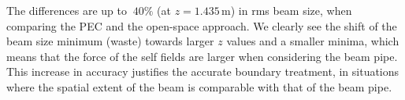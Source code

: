 
The differences are up to $~40\%$ (at $z=1.435$\,m) in rms beam size, when comparing the PEC and the open-space approach. We clearly see
the shift of the beam size minimum (waste) towards larger $z$ values and
a smaller minima, which means that the force of the self fields are
larger when considering the beam pipe.
This increase in accuracy justifies the 
accurate boundary treatment, in situations where the spatial extent of
the beam is comparable with that of the beam pipe.


